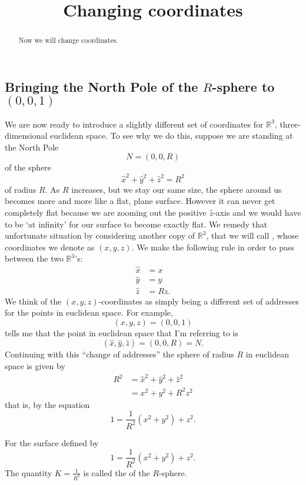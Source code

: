 \documentclass{ximera}
\title{Changing coordinates}
\begin{document}
\begin{abstract}
Now we will change coordinates.
\end{abstract}
\maketitle


\subsection*{Bringing the North Pole of the $R$-sphere to $\left(
0,0,1\right)  $}

We are now ready to introduce a slightly different set of coordinates for
$\mathbb{R}^{3}$, three-dimensional euclidean space. To see why we do this,
suppose we are standing at the North Pole%
\[
N=\left(0,0,R\right)
\]
of the sphere%
\[
\hat{x}^{2}+\hat{y}^{2}+\hat{z}^{2}=R^{2} %
\]
of radius $R$. As $R$ increases, but we stay our same size, the sphere
around us becomes more and more like a flat, plane surface. However it
can never get completely flat because we are zooming out the positive
$\hat{z}$-axis and we would have to be `at infinity' for our surface
to become exactly flat. We remedy that unfortunate situation by
considering another copy of $\mathbb{R}^{3}$, that we will call
, whose coordinates we denote as
$\left( x,y,z\right) $.  We make the following rule in order to pass
between the two $\mathbb{R}^{3}$'s:%
\begin{align*}
\hat{x}  &  =x\\
\hat{y}  &  =y\\
\hat{z}  &  =Rz.
\end{align*}
We think of the $\left( x,y,z\right) $-coordinates as simply being a
different set of addresses for the points in euclidean space. For
example,
\[
\left(x,y,z\right)  =\left(0,0,1\right)
\]
tells me that the point in euclidean space that I'm referring to is%
\[
\left(\hat{x},\hat{y},\hat{z}\right) =\left( 0,0,R\right)= N.
\]
Continuing with this ``change of addresses'' the sphere of radius $R$
in euclidean space is given by
\begin{align*}
R^{2} & =\hat{x}^{2}+\hat{y}^{2}+\hat{z}^{2}\\ &
=x^{2}+y^{2}+R^{2}z^{2}
\end{align*}
that is, by the equation
\[
1=\frac{1}{R^{2}}\left(  x^{2}+y^{2}\right)  +z^{2}. %
\]
\begin{definition}
  For the surface defined by
  \[
  1=\frac{1}{R^{2}}\left(  x^{2}+y^{2}\right)  +z^{2}. %
  \]
The quantity $K=\frac{1}{R^{2}}$ is called the  of the
$R$-sphere.
\end{definition}
\end{document}
